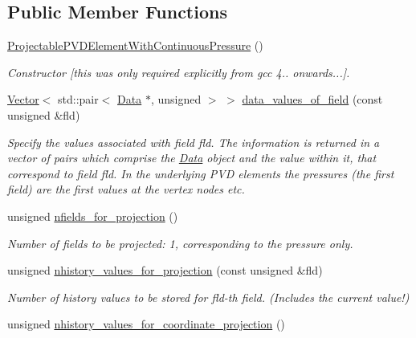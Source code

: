 \subsection*{Public Member Functions}
\begin{DoxyCompactItemize}
\item 
\hyperlink{classoomph_1_1ProjectablePVDElementWithContinuousPressure_a973f20aa3b0a7daffd6295f1aa51b475}{Projectable\+P\+V\+D\+Element\+With\+Continuous\+Pressure} ()
\begin{DoxyCompactList}\small\item\em Constructor \mbox{[}this was only required explicitly from gcc 4.. onwards...\mbox{]}. \end{DoxyCompactList}\item 
\hyperlink{classoomph_1_1Vector}{Vector}$<$ std\+::pair$<$ \hyperlink{classoomph_1_1Data}{Data} $\ast$, unsigned $>$ $>$ \hyperlink{classoomph_1_1ProjectablePVDElementWithContinuousPressure_ab36cf9002b4eba6b706379b609979c52}{data\+\_\+values\+\_\+of\+\_\+field} (const unsigned \&fld)
\begin{DoxyCompactList}\small\item\em Specify the values associated with field fld. The information is returned in a vector of pairs which comprise the \hyperlink{classoomph_1_1Data}{Data} object and the value within it, that correspond to field fld. In the underlying P\+VD elements the pressures (the first field) are the first values at the vertex nodes etc. \end{DoxyCompactList}\item 
unsigned \hyperlink{classoomph_1_1ProjectablePVDElementWithContinuousPressure_a022141e748543a3d95230707d64f8baf}{nfields\+\_\+for\+\_\+projection} ()
\begin{DoxyCompactList}\small\item\em Number of fields to be projected\+: 1, corresponding to the pressure only. \end{DoxyCompactList}\item 
unsigned \hyperlink{classoomph_1_1ProjectablePVDElementWithContinuousPressure_ae2e030a1740d31e491e9083c6b0107b4}{nhistory\+\_\+values\+\_\+for\+\_\+projection} (const unsigned \&fld)
\begin{DoxyCompactList}\small\item\em Number of history values to be stored for fld-\/th field. (Includes the current value!) \end{DoxyCompactList}\item 
unsigned \hyperlink{classoomph_1_1ProjectablePVDElementWithContinuousPressure_a67bdc9b19979dc1b77330fb1ab5f9493}{nhistory\+\_\+values\+\_\+for\+\_\+coordinate\+\_\+projection} ()

\end{DoxyCompactItemize}
